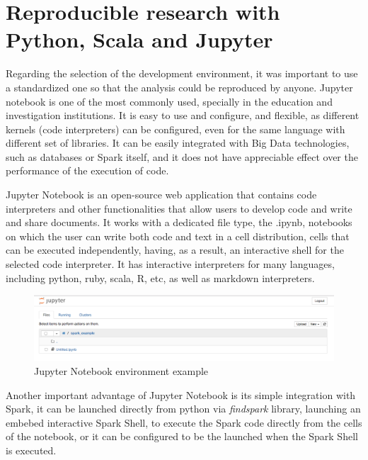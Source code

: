 \documentclass[11pt]{book} %
\begin{document}
  \section{Reproducible research with Python, Scala and Jupyter}

    Regarding the selection of the development environment, it was important to use a standardized one so that the analysis could be reproduced by anyone. Jupyter notebook is one of the most commonly used, specially in the education and investigation institutions. It is easy to use and configure, and flexible, as different kernels (code interpreters) can be configured, even for the same language with different set of libraries. It can be easily integrated with Big Data technologies, such as databases or Spark itself, and it does not have appreciable effect over the performance of the execution of code.

    Jupyter Notebook is an open-source web application that contains code interpreters and other functionalities that allow users to develop code and write and share documents. It works with a dedicated file type, the .ipynb, notebooks on which the user can write both code and text in a cell distribution, cells that can be executed independently, having, as a result, an interactive shell for the selected code interpreter. It has interactive interpreters for many languages, including python, ruby, scala, R, etc, as well as markdown interpreters.

    \begin{figure}[!ht]
      \centering
      \includegraphics[width=\textwidth]{jupyter_notebook.png}
      \caption{Jupyter Notebook environment example}
      \label{jupyter_notebook_environment}
    \end{figure}

    Another important advantage of Jupyter Notebook is its simple integration with Spark, it can be launched directly from python via \emph{findspark} library, launching an embebed interactive Spark Shell, to execute the Spark code directly from the cells of the notebook, or it can be configured to be the launched when the Spark Shell is executed.
\end{document}
